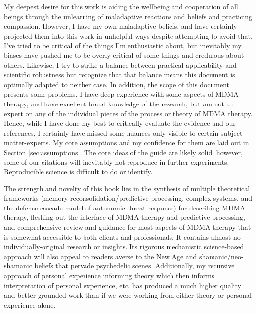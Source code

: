 \documentclass[12pt,letterpaper]{book}
\begin{document}
My deepest desire for this work is aiding the wellbeing and cooperation of all beings through the unlearning of maladaptive reactions and beliefs and practicing compassion. However, I have my own maladaptive beliefs, and have certainly projected them into this work in unhelpful ways despite attempting to avoid that. I've tried to be critical of the things I'm enthusiastic about, but inevitably my biases have pushed me to be overly critical of some things and credulous about others. Likewise, I try to strike a balance between practical applicability and scientific robustness but recognize that that balance means this document is optimally adapted to neither case. In addition, the scope of this document presents some problems. I have deep experience with some aspects of MDMA therapy, and have excellent broad knowledge of the research, but am not an expert on any of the individual pieces of the process or theory of MDMA therapy. Hence, while I have done my best to critically evaluate the evidence and our references, I certainly have missed some nuances only visible to certain subject-matter-experts. My core assumptions and my confidence for them are laid out in Section \ref{sec:assumptions}. The core ideas of the guide are likely solid, however, some of our citations will inevitably not reproduce in further experiments. Reproducible science is difficult to do or identify.


The strength and novelty of this book lies in the synthesis of multiple theoretical frameworks (memory-reconsolidation/predictive-processing, complex systems, and the defense cascade model of autonomic threat response) for describing MDMA therapy, fleshing out the interface of MDMA therapy and predictive processing, and comprehensive review and guidance for most aspects of MDMA therapy that is somewhat accessible to both clients and professionals. It contains almost no individually-original research or insights. Its rigorous mechanistic science-based approach will also appeal to readers averse to the New Age and shamanic/neo-shamanic beliefs that pervade psychedelic scenes. Additionally, my recursive approach of personal experience informing theory which then informs interpretation of personal experience, etc. has produced a much higher quality and better grounded work than if we were working from either theory or personal experience alone.
\end{document}
